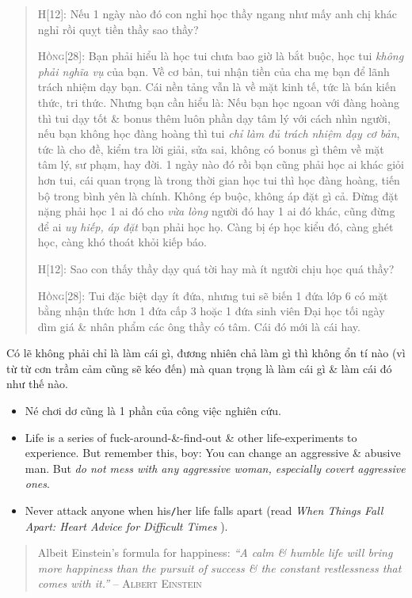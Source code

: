 \documentclass[12pt]{article}
\begin{document}
\begin{quote}
	H[12]: Nếu 1 ngày nào đó con nghỉ học thầy ngang như mấy anh chị khác nghỉ rồi quỵt tiền thầy sao thầy?
	
	\textsc{Hồng[28]}: Bạn phải hiểu là học tui chưa bao giờ là bắt buộc, học tui {\it không phải nghĩa vụ} của bạn. Về cơ bản, tui nhận tiền của cha mẹ bạn để lãnh trách nhiệm dạy bạn. Cái nền tảng vẫn là về mặt kinh tế, tức là bán kiến thức, tri thức. Nhưng bạn cần hiểu là: Nếu bạn học ngoan với đàng hoàng thì tui dạy tốt \& bonus thêm luôn phần dạy tâm lý với cách nhìn người, nếu bạn không học đàng hoàng thì tui {\it chỉ làm đủ trách nhiệm dạy cơ bản}, tức là cho đề, kiểm tra lời giải, sửa sai, không có bonus gì thêm về mặt tâm lý, sư phạm, hay đời. 1 ngày nào đó rồi bạn cũng phải học ai khác giỏi hơn tui, cái quan trọng là trong thời gian học tui thì học đàng hoàng, tiến bộ trong bình yên là chính. Không ép buộc, không áp đặt gì cả. Đừng đặt nặng phải học 1 ai đó cho {\it vừa lòng} người đó hay 1 ai đó khác, cũng đừng để ai {\it uy hiếp, áp đặt} bạn phải học họ. Càng bị ép học kiểu đó, càng ghét học, càng khó thoát khỏi kiếp báo.
	
	H[12]: Sao con thấy thầy dạy quá tời hay mà ít người chịu học quá thầy?
	
	\textsc{Hồng[28]}: Tui đặc biệt dạy ít đứa, nhưng tui sẽ biến 1 đứa lớp 6 có mặt bằng nhận thức hơn 1 đứa cấp 3 hoặc 1 đứa sinh viên Đại học tối ngày dìm giá \& nhân phẩm các ông thầy có tâm. Cái đó mới là cái hay.
\end{quote}

Có lẽ không phải chỉ là làm cái gì, đương nhiên chả làm gì thì không ổn tí nào (vì từ từ cơn trầm cảm cũng sẽ kéo đến) mà quan trọng là làm cái gì \& làm cái đó như thế nào.

\begin{itemize}
	\item Né chơi dơ cũng là 1 phần của công việc nghiên cứu.
	\item Life is a series of fuck-around-\&-find-out \& other life-experiments to experience. But remember this, boy: You can change an aggressive \& abusive man. But {\it do not mess with any aggressive woman, especially covert aggressive ones}. 
	\item Never attack anyone when his{\tt/}her life falls apart (read {\it When Things Fall Apart: Heart Advice for Difficult Times} \cite{Chodron2002, Chodron2021}).
\end{itemize}

\begin{quote}
	{\sc Albeit Einstein}'s formula for happiness: {\it``A calm \& humble life will bring more happiness than the pursuit of success \& the constant restlessness that comes with it.''} -- \textsc{Albert Einstein}
\end{quote}
\end{document}
